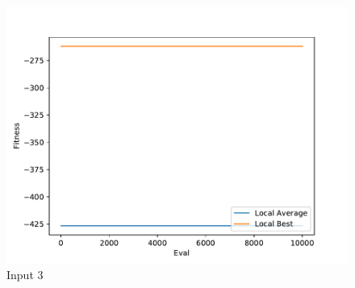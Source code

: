 \documentclass{standalone}
\begin{document}
\begin{figure}[!htb]
	\caption{Input 3}
	\label{fig:graph_3029}
	\includegraphics[width=\textwidth]{../graphs/graphs/3029.pdf}
\end{figure}
\end{document}
